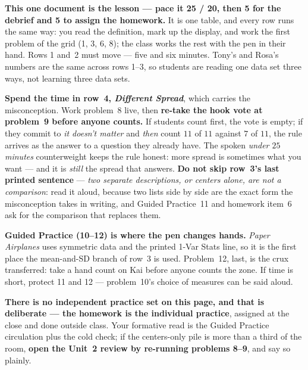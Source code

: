 \documentclass[10pt]{article}
\begin{document}
\begin{teachernote}
\textbf{This one document is the lesson --- pace it 25 / 20, then 5 for the debrief and 5 to
assign the homework.} It is one table, and every row runs the same way: you read the
definition, mark up the display, and work the first problem of the grid (1, 3, 6, 8); the
class works the rest with the pen in their hand. Rows 1 and~2 must move --- five and six
minutes. Tony's and Rosa's numbers are the same across rows 1--3, so students are reading one
data set three ways, not learning three data sets.

\textbf{Spend the time in row~4, \emph{Different Spread}}, which carries the misconception.
Work problem~8 live, then \textbf{re-take the hook vote at problem~9 before anyone counts.}
If students count first, the vote is empty; if they commit to \emph{it doesn't matter} and
\emph{then} count $11$ of $11$ against $7$ of $11$, the rule arrives as the answer to a
question they already have. The spoken \emph{under $25$ minutes} counterweight keeps the rule
honest: more spread is sometimes what you want --- and it is \emph{still} the spread that
answers. \textbf{Do not skip row~3's last printed sentence} --- \emph{two separate
descriptions, or centers alone, are not a comparison}: read it aloud, because two lists side
by side are the exact form the misconception takes in writing, and Guided Practice~11 and
homework item~6 ask for the comparison that replaces them.

\textbf{Guided Practice (10--12) is where the pen changes hands.} \emph{Paper Airplanes} uses
symmetric data and the printed 1-Var Stats line, so it is the first place the mean-and-SD
branch of row~3 is used. Problem~12, last, is the crux transferred: take a hand count on Kai
before anyone counts the zone. If time is short, protect 11 and 12 --- problem~10's choice of
measures can be said aloud.

\textbf{There is no independent practice set on this page, and that is deliberate --- the
homework is the individual practice}, assigned at the close and done outside class. Your
formative read is the Guided Practice circulation plus the cold check; if the centers-only
pile is more than a third of the room, \textbf{open the Unit~2 review by re-running
problems 8--9}, and say so plainly.
\end{teachernote}
\end{document}

